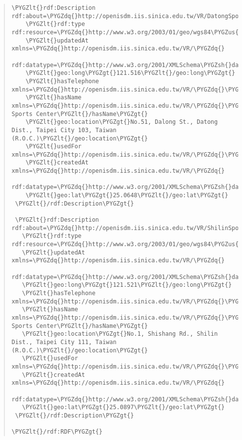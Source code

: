 \documentclass[letterpaper,10pt,english]{sphinxmanual}
\def\PYGZus{\char`\_}
\def\PYGZlt{\char`\<}
\def\PYGZgt{\char`\>}
\def\PYGZsh{\char`\#}
\def\PYGZhy{\char`\-}
\def\PYGZdq{\char`\"}
\begin{document}
\begin{quote}
\begin{Verbatim}[commandchars=\\\{\}]
 \PYGZlt{}rdf:Description rdf:about=\PYGZdq{}http://openisdm.iis.sinica.edu.tw/VR/DatongSportsCenter\PYGZdq{}\PYGZgt{}
    \PYGZlt{}rdf:type rdf:resource=\PYGZdq{}http://www.w3.org/2003/01/geo/wgs84\PYGZus{}pos\PYGZsh{}SpatialThing\PYGZdq{}/\PYGZgt{}
    \PYGZlt{}updatedAt xmlns=\PYGZdq{}http://openisdm.iis.sinica.edu.tw/VR/\PYGZdq{}
        rdf:datatype=\PYGZdq{}http://www.w3.org/2001/XMLSchema\PYGZsh{}dateTime\PYGZdq{}\PYGZgt{}2013\PYGZhy{}07\PYGZhy{}31T03:23:47Z\PYGZlt{}/updatedAt\PYGZgt{}
    \PYGZlt{}geo:long\PYGZgt{}121.516\PYGZlt{}/geo:long\PYGZgt{}
    \PYGZlt{}hasTelephone xmlns=\PYGZdq{}http://openisdm.iis.sinica.edu.tw/VR/\PYGZdq{}\PYGZgt{}2592\PYGZhy{}0055\PYGZlt{}/hasTelephone\PYGZgt{}
    \PYGZlt{}hasName xmlns=\PYGZdq{}http://openisdm.iis.sinica.edu.tw/VR/\PYGZdq{}\PYGZgt{}Datong Sports Center\PYGZlt{}/hasName\PYGZgt{}
    \PYGZlt{}geo:location\PYGZgt{}No.51, Dalong St., Datong Dist., Taipei City 103, Taiwan (R.O.C.)\PYGZlt{}/geo:location\PYGZgt{}
    \PYGZlt{}usedFor xmlns=\PYGZdq{}http://openisdm.iis.sinica.edu.tw/VR/\PYGZdq{}\PYGZgt{}Sport\PYGZlt{}/usedFor\PYGZgt{}
    \PYGZlt{}createdAt xmlns=\PYGZdq{}http://openisdm.iis.sinica.edu.tw/VR/\PYGZdq{}
        rdf:datatype=\PYGZdq{}http://www.w3.org/2001/XMLSchema\PYGZsh{}dateTime\PYGZdq{}\PYGZgt{}2012\PYGZhy{}11\PYGZhy{}28T09:05:13Z\PYGZlt{}/createdAt\PYGZgt{}
    \PYGZlt{}geo:lat\PYGZgt{}25.0648\PYGZlt{}/geo:lat\PYGZgt{}
 \PYGZlt{}/rdf:Description\PYGZgt{}

 \PYGZlt{}rdf:Description rdf:about=\PYGZdq{}http://openisdm.iis.sinica.edu.tw/VR/ShilinSportsCenter\PYGZdq{}\PYGZgt{}
   \PYGZlt{}rdf:type rdf:resource=\PYGZdq{}http://www.w3.org/2003/01/geo/wgs84\PYGZus{}pos\PYGZsh{}SpatialThing\PYGZdq{}/\PYGZgt{}
   \PYGZlt{}updatedAt xmlns=\PYGZdq{}http://openisdm.iis.sinica.edu.tw/VR/\PYGZdq{}
       rdf:datatype=\PYGZdq{}http://www.w3.org/2001/XMLSchema\PYGZsh{}dateTime\PYGZdq{}\PYGZgt{}2013\PYGZhy{}07\PYGZhy{}31T03:23:47Z\PYGZlt{}/updatedAt\PYGZgt{}
   \PYGZlt{}geo:long\PYGZgt{}121.521\PYGZlt{}/geo:long\PYGZgt{}
   \PYGZlt{}hasTelephone xmlns=\PYGZdq{}http://openisdm.iis.sinica.edu.tw/VR/\PYGZdq{}\PYGZgt{}2880\PYGZhy{}6066\PYGZlt{}/hasTelephone\PYGZgt{}
   \PYGZlt{}hasName xmlns=\PYGZdq{}http://openisdm.iis.sinica.edu.tw/VR/\PYGZdq{}\PYGZgt{}Shilin Sports Center\PYGZlt{}/hasName\PYGZgt{}
   \PYGZlt{}geo:location\PYGZgt{}No.1, Shishang Rd., Shilin Dist., Taipei City 111, Taiwan (R.O.C.)\PYGZlt{}/geo:location\PYGZgt{}
   \PYGZlt{}usedFor xmlns=\PYGZdq{}http://openisdm.iis.sinica.edu.tw/VR/\PYGZdq{}\PYGZgt{}Sport\PYGZlt{}/usedFor\PYGZgt{}
   \PYGZlt{}createdAt xmlns=\PYGZdq{}http://openisdm.iis.sinica.edu.tw/VR/\PYGZdq{}
       rdf:datatype=\PYGZdq{}http://www.w3.org/2001/XMLSchema\PYGZsh{}dateTime\PYGZdq{}\PYGZgt{}2012\PYGZhy{}11\PYGZhy{}28T09:05:13Z\PYGZlt{}/createdAt\PYGZgt{}
   \PYGZlt{}geo:lat\PYGZgt{}25.0897\PYGZlt{}/geo:lat\PYGZgt{}
 \PYGZlt{}/rdf:Description\PYGZgt{}

\PYGZlt{}/rdf:RDF\PYGZgt{}
\end{Verbatim}
\end{quote}
\end{document}
